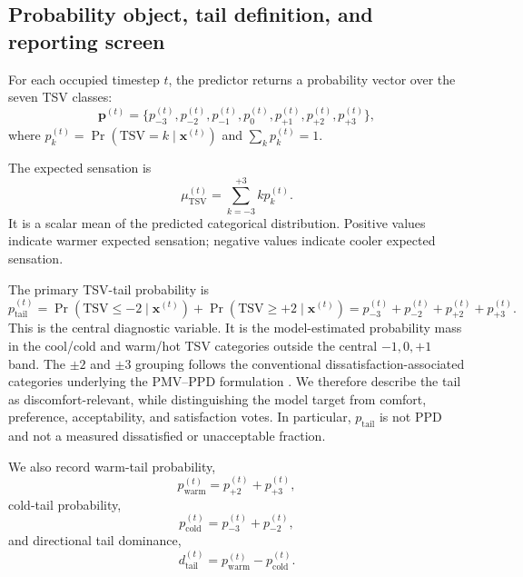 \subsection{Probability object, tail definition, and reporting screen}

For each occupied timestep $t$, the predictor returns a probability vector over the seven TSV classes:
\begin{equation}
\mathbf{p}^{(t)}=\{p_{-3}^{(t)},p_{-2}^{(t)},p_{-1}^{(t)},p_{0}^{(t)},p_{+1}^{(t)},p_{+2}^{(t)},p_{+3}^{(t)}\},
\end{equation}
where $p_k^{(t)}=\Pr(\mathrm{TSV}=k\mid \mathbf{x}^{(t)})$ and $\sum_k p_k^{(t)}=1$.

The expected sensation is
\begin{equation}
\mu_{\mathrm{TSV}}^{(t)}=\sum_{k=-3}^{+3} k p_k^{(t)} .
\end{equation}
It is a scalar mean of the predicted categorical distribution. Positive values indicate warmer expected sensation; negative values indicate cooler expected sensation.

The primary TSV-tail probability is
\begin{equation}
p_{\mathrm{tail}}^{(t)}
= \Pr(\mathrm{TSV}\le -2\mid \mathbf{x}^{(t)})+\Pr(\mathrm{TSV}\ge +2\mid \mathbf{x}^{(t)})
=p_{-3}^{(t)}+p_{-2}^{(t)}+p_{+2}^{(t)}+p_{+3}^{(t)} .
\end{equation}
This is the central diagnostic variable. It is the model-estimated probability mass in the cool/cold and warm/hot TSV categories outside the central $-1,0,+1$ band. The $\pm2$ and $\pm3$ grouping follows the conventional dissatisfaction-associated categories underlying the PMV--PPD formulation \citep{Fanger1970PMV,ASHRAE2023}. We therefore describe the tail as discomfort-relevant, while distinguishing the model target from comfort, preference, acceptability, and satisfaction votes. In particular, $p_{\mathrm{tail}}$ is not PPD and not a measured dissatisfied or unacceptable fraction.

We also record warm-tail probability,
\begin{equation}
p_{\mathrm{warm}}^{(t)}=p_{+2}^{(t)}+p_{+3}^{(t)},
\end{equation}
cold-tail probability,
\begin{equation}
p_{\mathrm{cold}}^{(t)}=p_{-3}^{(t)}+p_{-2}^{(t)},
\end{equation}
and directional tail dominance,
\begin{equation}
d_{\mathrm{tail}}^{(t)}=p_{\mathrm{warm}}^{(t)}-p_{\mathrm{cold}}^{(t)} .
\end{equation}

